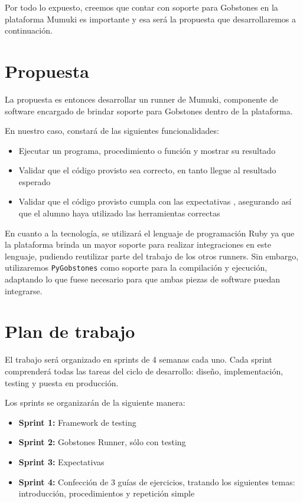 \documentclass[a4paper,10pt]{article}
\begin{document}
Por todo lo expuesto, creemos que contar con soporte para Gobstones en la plataforma Mumuki es importante y esa será la propuesta que desarrollaremos a continuación.

\section{Propuesta}
La propuesta es entonces desarrollar un runner de Mumuki, componente de software encargado de brindar soporte para Gobstones dentro de la plataforma.

En nuestro caso, constará de las siguientes funcionalidades:

\begin{itemize}
    \item Ejecutar un programa, procedimiento o función y mostrar su resultado
    \item Validar que el código provisto sea correcto, en tanto llegue al resultado esperado
    \item Validar que el código provisto cumpla con las expectativas \cite{expectativas}, asegurando así que el alumno haya utilizado las herramientas correctas
\end{itemize}

En cuanto a la tecnología, se utilizará el lenguaje de programación Ruby ya que la plataforma brinda un mayor soporte para realizar integraciones en este lenguaje, pudiendo reutilizar parte del trabajo de los otros runners. Sin embargo, utilizaremos \texttt{PyGobstones} como soporte para la compilación y ejecución, adaptando lo que fuese necesario para que ambas piezas de software puedan integrarse.

\section{Plan de trabajo}
El trabajo será organizado en sprints de 4 semanas cada uno. Cada sprint comprenderá todas las tareas del ciclo de desarrollo: diseño, implementación, testing y puesta en producción.

Los sprints se organizarán de la siguiente manera:

\begin{itemize}
    \item \textbf{Sprint 1:} Framework de testing
    \item \textbf{Sprint 2:} Gobstones Runner, sólo con testing
    \item \textbf{Sprint 3:} Expectativas
    \item \textbf{Sprint 4:} Confección de 3 guías de ejercicios, tratando los siguientes temas: introducción, procedimientos y repetición simple
\end{itemize}

\printbibliography
\end{document}
